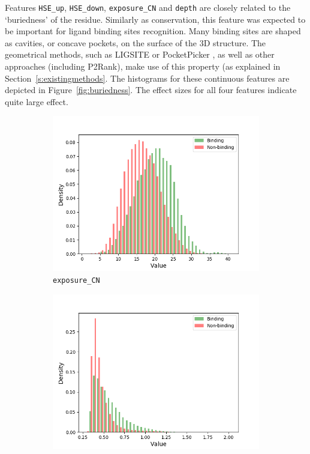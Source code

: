 Features \texttt{HSE\_up}, \texttt{HSE\_down}, \texttt{exposure\_CN} and \texttt{depth} are closely related to the `buriedness' of the residue. Similarly as conservation, this feature was expected to be important for ligand binding sites recognition. Many binding sites are shaped as cavities, or concave pockets, on the surface of the 3D structure. The geometrical methods, such as LIGSITE \cite{ligsite} or PocketPicker \cite{pocketpicker}, as well as other approaches (including P2Rank), make use of this property (as explained in Section~\ref{s:existingmethods}. The histograms for these continuous features are depicted in Figure~\ref{fig:buriedness}. The effect sizes for all four features indicate quite large effect.


\begin{figure}[]
\centering
\begin{subfigure}{.5\textwidth}
  \centering
  \includegraphics[width=1\linewidth]{../img/exposure_CN_hist.png}
  \caption{\texttt{exposure\_CN}}
\end{subfigure}%
\begin{subfigure}{.5\textwidth}
  \centering
  \includegraphics[width=1\linewidth]{../img/depth_hist.png}

\end{subfigure}
\end{figure}
